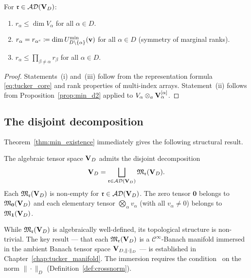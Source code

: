 \begin{proposition}
\label{prop:admissible_bounds}
For $\mathfrak{r} \in \mathcal{AD}(\mathbf{V}_D)$:
\begin{enumerate}
\item[\textup{(i)}] $r_\alpha \leq \dim V_\alpha$ for all $\alpha \in D$.
\item[\textup{(ii)}] $r_\alpha = r_{\alpha^c} \coloneqq
    \dim U^{\min}_{D\setminus\{\alpha\}}(\mathbf{v})$ for all $\alpha \in D$
    \textup{(}symmetry of marginal ranks\textup{)}.
\item[\textup{(iii)}] $r_\alpha \leq \prod_{\beta \neq \alpha} r_\beta$
    for all $\alpha \in D$.
\end{enumerate}
\end{proposition}

\begin{proof}
Statements~(i) and~(iii) follow from the representation formula
\eqref{eq:tucker_core} and rank properties of multi-index arrays.
Statement~(ii) follows from Proposition~\ref{prop:min_d2} applied
to $V_\alpha \otimes_a \mathbf{V}_\alpha^{[\alpha]}$.
\end{proof}

\subsection*{The disjoint decomposition}

Theorem~\ref{thm:min_existence} immediately gives the following
structural result.

\begin{theorem}
\label{thm:tucker_decomposition_full}
The algebraic tensor space $\mathbf{V}_D$ admits the disjoint decomposition
\begin{equation}
\label{eq:tucker_disjoint_full}
    \mathbf{V}_D = \bigsqcup_{\mathfrak{r} \in \mathcal{AD}(\mathbf{V}_D)} \mathfrak{M}_{\mathfrak{r}}(\mathbf{V}_D).
\end{equation}
Each $\mathfrak{M}_{\mathfrak{r}}(\mathbf{V}_D)$ is non-empty for $\mathfrak{r} \in \mathcal{AD}(\mathbf{V}_D)$.
The zero tensor $\mathbf{0}$ belongs to $\mathfrak{M}_{\mathbf{0}}(\mathbf{V}_D)$
and each elementary tensor $\bigotimes_\alpha v_\alpha$ (with all
$v_\alpha \neq 0$) belongs to $\mathfrak{M}_{\mathbf{1}}(\mathbf{V}_D)$.
\end{theorem}

\begin{remark}
\label{rem:tucker_topology}
While $\mathfrak{M}_{\mathfrak{r}}(\mathbf{V}_D)$ is algebraically well-defined, its
topological structure is non-trivial. The key result —
that each $\mathfrak{M}_{\mathfrak{r}}(\mathbf{V}_D)$ is a $\mathcal{C}^\infty$-Banach
manifold immersed in the ambient Banach tensor space $\mathbf{V}_{D,\|\cdot\|_D}$ —
is established in Chapter~\ref{chap:tucker_manifold}. The immersion
requires the condition \condINJ\ on the norm $\|\cdot\|_D$
(Definition~\ref{def:crossnorm}).
\end{remark}

